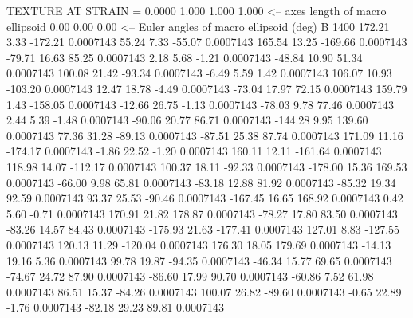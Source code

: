 TEXTURE AT STRAIN =    0.0000
   1.000   1.000   1.000  <-- axes length of macro ellipsoid
    0.00    0.00    0.00  <-- Euler angles of macro ellipsoid (deg)
B      1400
      172.21        3.33     -172.21     0.0007143
       55.24        7.33      -55.07     0.0007143
      165.54       13.25     -169.66     0.0007143
      -79.71       16.63       85.25     0.0007143
        2.18        5.68       -1.21     0.0007143
      -48.84       10.90       51.34     0.0007143
      100.08       21.42      -93.34     0.0007143
       -6.49        5.59        1.42     0.0007143
      106.07       10.93     -103.20     0.0007143
       12.47       18.78       -4.49     0.0007143
      -73.04       17.97       72.15     0.0007143
      159.79        1.43     -158.05     0.0007143
      -12.66       26.75       -1.13     0.0007143
      -78.03        9.78       77.46     0.0007143
        2.44        5.39       -1.48     0.0007143
      -90.06       20.77       86.71     0.0007143
     -144.28        9.95      139.60     0.0007143
       77.36       31.28      -89.13     0.0007143
      -87.51       25.38       87.74     0.0007143
      171.09       11.16     -174.17     0.0007143
       -1.86       22.52       -1.20     0.0007143
      160.11       12.11     -161.64     0.0007143
      118.98       14.07     -112.17     0.0007143
      100.37       18.11      -92.33     0.0007143
     -178.00       15.36      169.53     0.0007143
      -66.00        9.98       65.81     0.0007143
      -83.18       12.88       81.92     0.0007143
      -85.32       19.34       92.59     0.0007143
       93.37       25.53      -90.46     0.0007143
     -167.45       16.65      168.92     0.0007143
        0.42        5.60       -0.71     0.0007143
      170.91       21.82      178.87     0.0007143
      -78.27       17.80       83.50     0.0007143
      -83.26       14.57       84.43     0.0007143
     -175.93       21.63     -177.41     0.0007143
      127.01        8.83     -127.55     0.0007143
      120.13       11.29     -120.04     0.0007143
      176.30       18.05      179.69     0.0007143
      -14.13       19.16        5.36     0.0007143
       99.78       19.87      -94.35     0.0007143
      -46.34       15.77       69.65     0.0007143
      -74.67       24.72       87.90     0.0007143
      -86.60       17.99       90.70     0.0007143
      -60.86        7.52       61.98     0.0007143
       86.51       15.37      -84.26     0.0007143
      100.07       26.82      -89.60     0.0007143
       -0.65       22.89       -1.76     0.0007143
      -82.18       29.23       89.81     0.0007143
